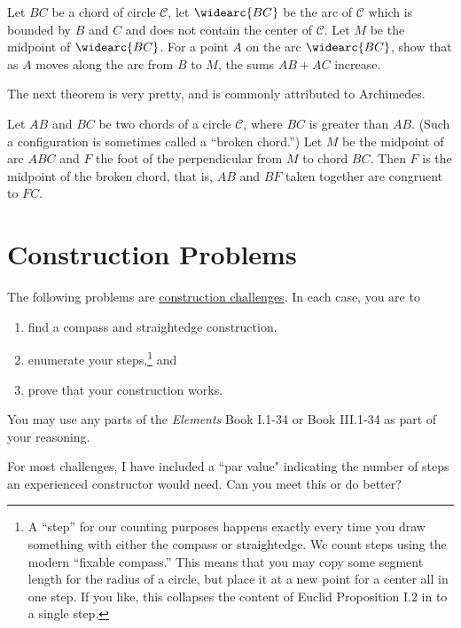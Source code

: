 \begin{conjecture}
Let $BC$ be a chord of circle $\mathcal{C}$, let $\widearc{BC}$ be the arc of $\mathcal{C}$ which is bounded by $B$ and $C$ and does not contain the center of $\mathcal{C}$.
Let $M$ be the midpoint of $\widearc{BC}$.
For a point $A$ on the arc $\widearc{BC}$, show that as $A$ moves along the arc from $B$ to $M$, the sums $AB+AC$ increase.
\end{conjecture}


The next theorem is very pretty, and is commonly attributed to Archimedes.

\begin{conjecture} Let $AB$ and $BC$ be two chords of a circle $\mathcal{C}$, where $BC$ is greater than $AB$.
(Such a configuration is sometimes called a ``broken chord.'')
Let $M$ be the midpoint of arc ${ABC}$ and $F$ the foot of the perpendicular from $M$ to chord $BC$.
Then $F$ is the midpoint of the broken chord, that is, $AB$ and $BF$ taken together are congruent to $FC$.
\end{conjecture}



\chapter{Construction Problems}

The following problems are \underline{construction challenges}. In each case, you are to
\begin{enumerate}
\item find a compass and straightedge construction,
\item enumerate your steps,\footnote{A ``step'' for our counting purposes happens exactly every time you draw something with either the compass or straightedge.
We count steps using the modern ``fixable compass.''
This means that you may copy some segment length for the radius of a circle, but place it at a new point for a center all in one step.
If you like, this collapses the content of Euclid Proposition I.2 in to a single step.} and
\item prove that your construction works.
\end{enumerate}
You may use any parts of the \emph{Elements} Book I.1-34 or Book III.1-34 as part of your reasoning.



For most challenges, I have included a ``par value" indicating the number of steps an experienced constructor would need.
Can you meet this or do better?


